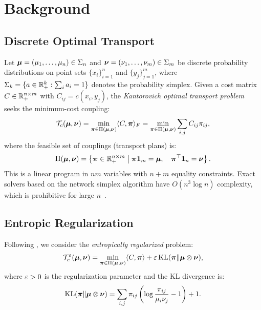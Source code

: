 
\section{Background}
\label{sec:background}

\subsection{Discrete Optimal Transport}

Let $\bm{\mu} = (\mu_1, \ldots, \mu_n) \in \Sigma_n$ and $\bm{\nu} = (\nu_1, \ldots, \nu_m) \in \Sigma_m$ be discrete probability distributions on point sets $\{x_i\}_{i=1}^n$ and $\{y_j\}_{j=1}^m$, where $\Sigma_k = \{a \in \mathbb{R}_+^k : \sum_i a_i = 1\}$ denotes the probability simplex. Given a cost matrix $C \in \mathbb{R}_+^{n \times m}$ with $C_{ij} = c(x_i, y_j)$, the \emph{Kantorovich optimal transport problem} seeks the minimum-cost coupling:
\begin{equation}
    \label{eq:kantorovich}
    \mathcal{T}_c(\bm{\mu}, \bm{\nu}) = \min_{\bm{\pi} \in \Pi(\bm{\mu}, \bm{\nu})} \langle C, \bm{\pi} \rangle_F = \min_{\bm{\pi} \in \Pi(\bm{\mu}, \bm{\nu})} \sum_{i,j} C_{ij} \pi_{ij},
\end{equation}
where the feasible set of couplings (transport plans) is:
\begin{equation}
    \label{eq:coupling_set}
    \Pi(\bm{\mu}, \bm{\nu}) = \left\{ \bm{\pi} \in \mathbb{R}_+^{n \times m} \;\middle|\; \bm{\pi} \mathbf{1}_m = \bm{\mu}, \quad \bm{\pi}^\top \mathbf{1}_n = \bm{\nu} \right\}.
\end{equation}
This is a linear program in $nm$ variables with $n + m$ equality constraints. Exact solvers based on the network simplex algorithm have $O(n^3 \log n)$ complexity, which is prohibitive for large $n$~\citep{peyre2019computational}.

\subsection{Entropic Regularization}

Following \citet{cuturi2013sinkhorn}, we consider the \emph{entropically regularized} problem:
\begin{equation}
    \label{eq:regularized_ot}
    \mathcal{T}_c^\varepsilon(\bm{\mu}, \bm{\nu}) = \min_{\bm{\pi} \in \Pi(\bm{\mu}, \bm{\nu})} \langle C, \bm{\pi} \rangle + \varepsilon \, \mathrm{KL}(\bm{\pi} \| \bm{\mu} \otimes \bm{\nu}),
\end{equation}
where $\varepsilon > 0$ is the regularization parameter and the KL divergence is:
\begin{equation}
    \mathrm{KL}(\bm{\pi} \| \bm{\mu} \otimes \bm{\nu}) = \sum_{i,j} \pi_{ij} \left( \log \frac{\pi_{ij}}{\mu_i \nu_j} - 1 \right) + 1.
\end{equation}

